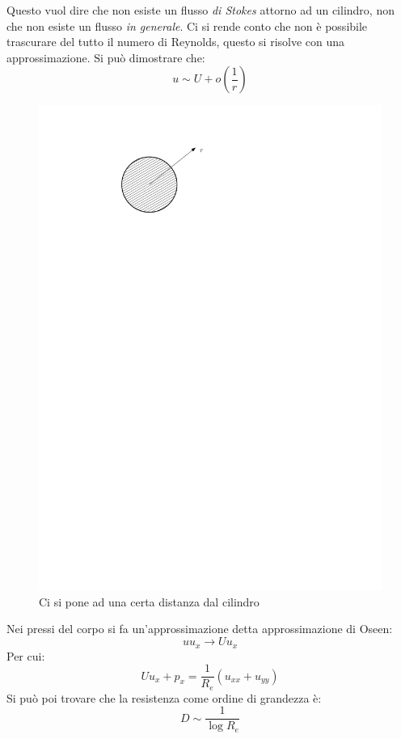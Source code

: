Questo vuol dire che non esiste un flusso \textit{di Stokes} attorno ad un cilindro, non che non esiste un flusso \textit{in generale}.
Ci si rende conto che non è possibile trascurare del tutto il numero di Reynolds, questo si risolve con una approssimazione.
Si può dimostrare che:
%
	\begin{equation*}
		u \sim U + o\left( \frac{1}{r} \right)
	\end{equation*}
%
	\begin{figure}[ht]
		\includegraphics[scale=0.7]{./6.4 Correnti a basso numero di Reynolds/6.4-2}
		\centering
		\caption{Ci si pone ad una certa distanza dal cilindro}
	\end{figure}
%
Nei pressi del corpo si fa un'approssimazione detta approssimazione di Oseen:
%
	\begin{equation*}
		u u_x \rightarrow U u_x
	\end{equation*}
%
Per cui:
%
	\begin{equation*}
		U u_x + p_x = \frac{1}{R_e} (u_{xx} + u_{yy})
	\end{equation*}
%
Si può poi trovare che la resistenza come ordine di grandezza è:
%
	\begin{equation*}
		D \sim \frac{1}{\log{R_e}}
	\end{equation*}
%

